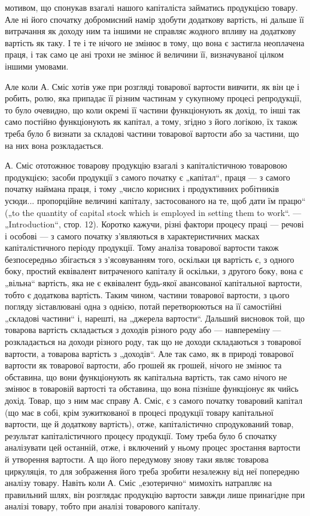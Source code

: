 \parcont{}  %
мотивом, що спонукав взагалі нашого капіталіста займатись продукцією
товару. Але ні його спочатку добромисний намір здобути додаткову
вартість, ні дальше її витрачання як доходу ним та іншими не справляє
жодного впливу на додаткову вартість як таку. І те і те нічого не змінює
в тому, що вона є застигла неоплачена праця, і так само це ані
трохи не змінює й величини її, визначуваної цілком іншими умовами.

Але коли А. Сміс хотів уже при розгляді товарової вартости вивчити,
як він це і робить, ролю, яка припадає її різним частинам у сукупному
процесі репродукції, то було очевидно, що коли окремі її частини
функціонують як дохід, то інші так само постійно функціонують як капітал,
а тому, згідно з його логікою, їх також треба було б визнати за
складові частини товарової вартости або за частини, що на них вона
розкладається.

А. Сміс ототожнює товарову продукцію взагалі з капіталістичною
товаровою продукцією; засоби продукції з самого початку є „капітал“,
праця — з самого початку наймана праця, і тому „число корисних і продуктивних
робітників усюди... пропорційне величині капіталу, застосованого
на те, щоб дати їм працю“ („to the quantity of capital stock which
is employed in setting them to work“. — „Introduction“, стор. 12). Коротко
кажучи, різні фактори процесу праці — речові і особові — з самого початку
з’являються в характеристичних масках капіталістичного періоду
продукції. Тому аналіза товарової вартости також безпосередньо збігається
з з’ясовуванням того, оскільки ця вартість є, з одного боку, простий
еквівалент витраченого капіталу й оскільки, з другого боку, вона є
„вільна“ вартість, яка не є еквівалент будь-якої авансованої капітальної
вартости, тобто є додаткова вартість. Таким чином, частини товарової
вартости, з цього погляду зіставлювані одна з однією, потай перетворюються
на її самостійні „складові частини“ і, нарешті, на „джерела вартости“.
Дальший висновок той, що товарова вартість складається з доходів
різного роду або — навпереміну — розкладається на доходи різного
роду, так що не доходи складаються з товарової вартости, а товарова
вартість з „доходів“. Але так само, як в природі товарової вартости як
товарової вартости, або грошей як грошей, нічого не змінює та обставина,
що вони функціонують як капітальна вартість, так само нічого не
змінює в товаровій вартості та обставина, що вона пізніше функціонує
як чийсь дохід. Товар, що з ним має справу А. Сміс, є з самого початку
товаровий капітал (що має в собі, крім зужиткованої в процесі продукції
товару капітальної вартости, ще й додаткову вартість), отже, капіталістично
спродукований товар, результат капіталістичного процесу
продукції. Тому треба було б спочатку аналізувати цей останній, отже,
і включений у ньому процес зростання вартости й утворення вартости.
А що його передумову знову таки являє товарова циркуляція, то для
зображення його треба зробити незалежну від неї попередню аналізу
товару. Навіть коли А. Сміс „езотерично“ мимохіть натрапляє на правильний
шлях, він розглядає продукцію вартости завжди лише принагідне
при аналізі товару, тобто при аналізі товарового капіталу.
